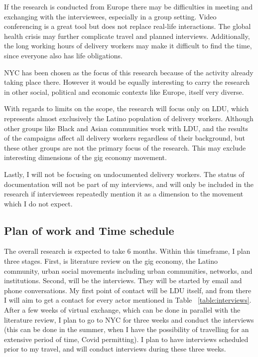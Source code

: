 \documentclass{article}
\begin{document}
If the research is conducted from Europe there may be difficulties in meeting and exchanging with the interviewees, especially in a group setting. Video conferencing is a great tool but does not replace real-life interactions. The global health crisis may further complicate travel and planned interviews. Additionally, the long working hours of delivery workers may make it difficult to find the time, since everyone also has life obligations.

NYC has been chosen as the focus of this research because of the activity already taking place there. However it would be equally interesting to carry the research in other social, political and economic contexts like Europe, itself very diverse.

With regards to limits on the scope, the research will focus only on LDU, which represents almost exclusively the Latino population of delivery workers. Although other groups like Black and Asian communities work with LDU, and the results of the campaigns affect all delivery workers regardless of their background, but these other groups are not the primary focus of the research. This may exclude interesting dimensions of the gig economy movement. 

Lastly, I will not be focusing on undocumented delivery workers. The status of documentation will not be part of my interviews, and will only be included in the research if interviewees repeatedly mention it as a dimension to the movement which I do not expect.

\subsection{Plan of work and Time schedule}

The overall research is expected to take 6 months. Within this timeframe, I plan three stages. First, is literature review on the gig economy, the Latino community, urban social movements including urban communities, networks, and institutions. Second, will be the interviews. They will be started by email and phone conversations. My first point of contact will be LDU itself, and from there I will aim to get a contact for every actor mentioned in Table ~\ref{table:interviews}. After a few weeks of virtual exchange, which can be done in parallel with the literature review, I plan to go to NYC for three weeks and conduct the interviews (this can be done in the summer, when I have the possibility of travelling for an extensive period of time, Covid permitting). I plan to have interviews scheduled prior to my travel, and will conduct interviews during  these three weeks.
\end{document}
